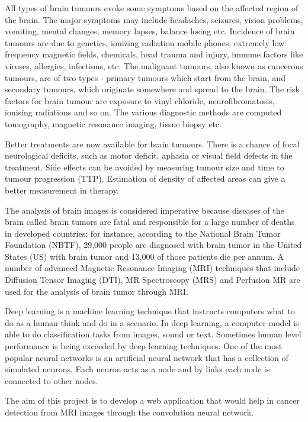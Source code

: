 All types of brain tumours evoke some symptoms based on the affected region of the brain. The major symptoms may include headaches, seizures, vision problems, vomiting, mental changes, memory lapses, balance losing etc. Incidence of brain tumours are due to genetics, ionizing radiation mobile phones, extremely low frequency magnetic fields, chemicals, head trauma and injury, immune factors like viruses, allergies, infections, etc. The malignant tumours, also known as cancerous tumours, are of two types - primary tumours which start from the brain, and secondary tumours, which originate somewhere and spread to the brain. The risk factors for brain tumour are exposure to vinyl chloride, neurofibromatosis, ionising radiations and so on. The various diagnostic methods are computed tomography, magnetic resonance imaging, tissue biopsy etc. \par
Better treatments are now available for brain tumours. There is a chance of focal neurological deficits, such as motor deficit, aphasia or visual field defects in the treatment. Side effects can be avoided by measuring tumour size and time to tumour progression (TTP). Estimation of density of affected areas can give a better measurement in therapy. \par
The analysis of brain images is considered imperative because diseases of the brain called brain tumors are fatal and responsible for a large number of deaths in developed countries; for instance, according to the National Brain Tumor Foundation (NBTF), 29,000 people are diagnosed with brain tumor in the United States (US) with brain tumor and 13,000 of those patients die per annum. A number of advanced Magnetic Resonance Imaging (MRI) techniques that include Diffusion Tensor Imaging (DTI), MR Spectroscopy (MRS) and Perfusion MR are used for the analysis of brain tumor through MRI.\par 
Deep learning is a machine learning technique that instructs computers what to do as a human think and do in a scenario. In deep learning, a computer model is able to do classification tasks from images, sound or text. Sometimes human level performance is being exceeded by deep learning techniques. One of the most popular neural networks is an artificial neural network that has a collection of simulated neurons. Each neuron acts as a node and by links each node is connected to other nodes. \par
The aim of this project is to develop a web application that would help in cancer detection from MRI images through the convolution neural network.\\ 

